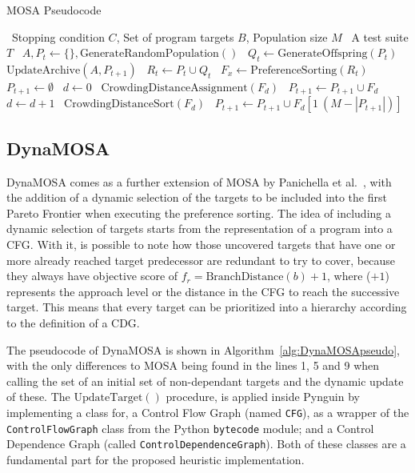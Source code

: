 \documentclass[%
  chapterprefix=false,%
  open=right,%
  twoside=true,%
  paper=a4,%
  logofile={Figures/logo.png},%
  thesistype=master,%
  UKenglish,%
]{se2thesis}
\newcommand{\classname}[1]{\texttt{#1}}
\begin{document}
\algrenewcommand{}
\algrenewcommand{}


\begin{algorithm}[h!]
  \centering
  \caption{MOSA Pseudocode}\label{alg:MOSApseudo}
  \begin{algorithmic}[1]
    \Require~Stopping condition \(C\), Set of program targets \(B\), Population size \(M\)
    \Ensure~A test suite \(T\)
    \State~\(A, P_t \gets \{\}, \text{GenerateRandomPopulation}()\) 
      \State~\(Q_t \gets \text{GenerateOffspring}(P_t)\)
      \State~\(\text{UpdateArchive}(A, P_{t+1})\)
      \State~\(R_t \gets P_t \cup Q_t\)
      \State~\(F_x \gets \text{PreferenceSorting}(R_t)\)
      \State~\(P_{t+1} \gets \emptyset \)
      \State~\(d \gets 0\)
        \State~\(\text{CrowdingDistanceAssignment}(F_d)\)
        \State~\(P_{t+1} \gets P_{t+1} \cup F_d\)
        \State~\(d \gets d + 1\)
      \EndWhile\@
      \State~\(\text{CrowdingDistanceSort}(F_d)\)
      \State~\(P_{t+1} \gets P_{t+1} \cup F_d[1\: (M - |P_{t+1}|)]\)
    \EndWhile\@
  \end{algorithmic}
\end{algorithm}

\newpage

\subsection{DynaMOSA}\label{sec:dynamosa}

DynaMOSA comes as a further extension of MOSA by Panichella et al.~\cite{DBLP:journals/tse/PanichellaKT18}, with the addition of a dynamic selection of the targets to be included into the first Pareto Frontier when executing the preference sorting.
The idea of including a dynamic selection of targets starts from the representation of a program into a CFG.
With it, is possible to note how those uncovered targets that have one or more already reached target predecessor are redundant to try to cover, because they always have objective score of \(f_r = \text{BranchDistance}(b) + 1\), where (\(+1\)) represents the approach level or the distance in the CFG to reach the successive target.
This means that every target can be prioritized into a hierarchy according to the definition of a CDG.

The pseudocode of DynaMOSA is shown in Algorithm~\ref{alg:DynaMOSApseudo}, with the only differences to MOSA being found in the lines 1, 5 and 9 when calling the set of an initial set of non-dependant targets and the dynamic update of these.
The \(\text{UpdateTarget}()\) procedure, is applied inside Pynguin by implementing a class for, a Control Flow Graph (named \classname{CFG}), as a wrapper of the \classname{ControlFlowGraph} class from the Python \classname{bytecode} module; and a Control Dependence Graph (called \classname{ControlDependenceGraph}).
Both of these classes are a fundamental part for the proposed heuristic implementation.
\end{document}
